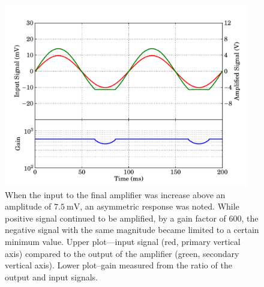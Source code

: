 \begin{figure}[t]
\begin{center}
\includegraphics[width = 0.95\textwidth]{figures/final_amp_gain_limit}
\caption[Asymmetric limit to input of the final amplifier]{When the input to the final amplifier was increase above an amplitude of $7.5~\mathrm{mV}$, an asymmetric response was noted. While positive signal continued to be amplified, by a gain factor of 600, the negative signal with the same magnitude became limited to a certain minimum value. Upper plot---input signal (red, primary vertical axis) compared to the output of the amplifier (green, secondary vertical axis). Lower plot--gain measured from the ratio of the output and input signals.}
\label{fig:finalAmp_gain_limit}
\end{center}
\end{figure}
\par 
